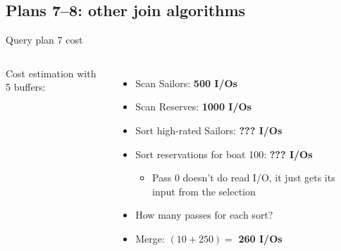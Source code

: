 \subsection{Plans 7--8: other join algorithms}


\begin{frame}{Query plan 7 cost }
  \begin{columns}[c]
      Cost estimation with 5 buffers:
      \begin{itemize}
        \item Scan Sailors: \textbf{500 I/Os}
        \item Scan Reserves: \textbf{1000 I/Os}
        \item Sort high-rated Sailors: \textbf{??? I/Os}
        \item Sort reservations for boat 100: \textbf{??? I/Os}
        \begin{itemize}
          \item Pass 0 doesn't do read I/O, it just gets its input from the selection
        \end{itemize}
        \item How many passes for each sort?
        \item Merge: $(10 + 250) = $ \textbf{260 I/Os}
      \end{itemize}
      \planbox[hl]{56mm}{\PlanSeven}
  \end{columns}
\end{frame}

